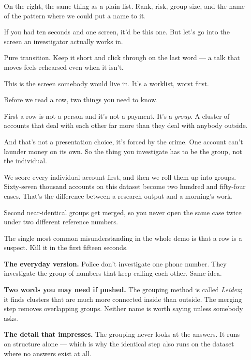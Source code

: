 \documentclass[11pt]{article}
\begin{document}
\begin{saythis}
On the right, the same thing as a plain list. Rank, risk, group size, and the
name of the pattern where we could put a name to it.

If you had ten seconds and one screen, it'd be this one. But let's go into the
screen an investigator actually works in.
\end{saythis}

\begin{means}
Pure transition. Keep it short and click through on the last word --- a talk
that moves feels rehearsed even when it isn't.
\end{means}



\begin{saythis}
This is the screen somebody would live in. It's a worklist, worst first.

Before we read a row, two things you need to know.

First \bt a row is not a person and it's not a payment. It's a \emph{group}. A
cluster of accounts that deal with each other far more than they deal with
anybody outside.

And that's not a presentation choice, it's forced by the crime. One account
can't launder money on its own. So the thing you investigate has to be the
group, not the individual.

We score every individual account first, and then we roll them up into groups.
Sixty-seven thousand accounts on this dataset become two hundred and fifty-four
cases. That's the difference between a research output and a morning's work.

Second \bt near-identical groups get merged, so you never open the same case
twice under two different reference numbers.
\end{saythis}

\begin{means}
The single most common misunderstanding in the whole demo is that a row is a
suspect. Kill it in the first fifteen seconds.

\textbf{The everyday version.} Police don't investigate one phone number. They
investigate the group of numbers that keep calling each other. Same idea.

\textbf{Two words you may need if pushed.} The grouping method is called
\emph{Leiden}; it finds clusters that are much more connected inside than
outside. The merging step removes overlapping groups. Neither name is worth
saying unless somebody asks.

\textbf{The detail that impresses.} The grouping never looks at the answers.
It runs on structure alone --- which is why the identical step also runs on the
dataset where no answers exist at all.
\end{means}
\end{document}
